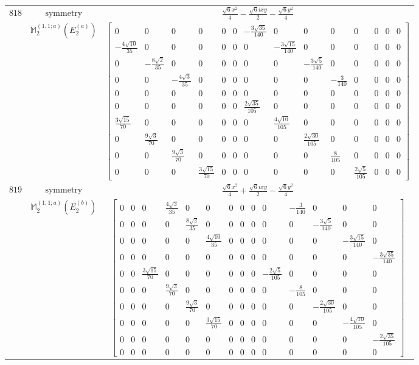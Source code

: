 \documentclass[fleqn,8pt,landscape]{jsarticle}
\begin{document}
\begin{longtable}{ccc}
$ 818 $ & $ \text{symmetry} $ & $ \frac{\sqrt{6} x^{2}}{4} - \frac{\sqrt{6} i x y}{2} - \frac{\sqrt{6} y^{2}}{4} $ \\
$  $ & $ \mathbb{M}_{2}^{(1,1;a)}(E_{2}^{(a)}) $ & $ \begin{bmatrix} 0 & 0 & 0 & 0 & 0 & 0 & - \frac{3 \sqrt{35}}{140} & 0 & 0 & 0 & 0 & 0 & 0 & 0 \\ - \frac{4 \sqrt{10}}{35} & 0 & 0 & 0 & 0 & 0 & 0 & - \frac{3 \sqrt{15}}{140} & 0 & 0 & 0 & 0 & 0 & 0 \\ 0 & - \frac{8 \sqrt{2}}{35} & 0 & 0 & 0 & 0 & 0 & 0 & - \frac{3 \sqrt{5}}{140} & 0 & 0 & 0 & 0 & 0 \\ 0 & 0 & - \frac{4 \sqrt{3}}{35} & 0 & 0 & 0 & 0 & 0 & 0 & - \frac{3}{140} & 0 & 0 & 0 & 0 \\ 0 & 0 & 0 & 0 & 0 & 0 & 0 & 0 & 0 & 0 & 0 & 0 & 0 & 0 \\ 0 & 0 & 0 & 0 & 0 & 0 & \frac{2 \sqrt{35}}{105} & 0 & 0 & 0 & 0 & 0 & 0 & 0 \\ \frac{3 \sqrt{15}}{70} & 0 & 0 & 0 & 0 & 0 & 0 & \frac{4 \sqrt{10}}{105} & 0 & 0 & 0 & 0 & 0 & 0 \\ 0 & \frac{9 \sqrt{3}}{70} & 0 & 0 & 0 & 0 & 0 & 0 & \frac{2 \sqrt{30}}{105} & 0 & 0 & 0 & 0 & 0 \\ 0 & 0 & \frac{9 \sqrt{3}}{70} & 0 & 0 & 0 & 0 & 0 & 0 & \frac{8}{105} & 0 & 0 & 0 & 0 \\ 0 & 0 & 0 & \frac{3 \sqrt{15}}{70} & 0 & 0 & 0 & 0 & 0 & 0 & \frac{2 \sqrt{5}}{105} & 0 & 0 & 0 \end{bmatrix} $ \\ \hline
$ 819 $ & $ \text{symmetry} $ & $ \frac{\sqrt{6} x^{2}}{4} + \frac{\sqrt{6} i x y}{2} - \frac{\sqrt{6} y^{2}}{4} $ \\
$  $ & $ \mathbb{M}_{2}^{(1,1;a)}(E_{2}^{(b)}) $ & $ \begin{bmatrix} 0 & 0 & 0 & \frac{4 \sqrt{3}}{35} & 0 & 0 & 0 & 0 & 0 & 0 & - \frac{3}{140} & 0 & 0 & 0 \\ 0 & 0 & 0 & 0 & \frac{8 \sqrt{2}}{35} & 0 & 0 & 0 & 0 & 0 & 0 & - \frac{3 \sqrt{5}}{140} & 0 & 0 \\ 0 & 0 & 0 & 0 & 0 & \frac{4 \sqrt{10}}{35} & 0 & 0 & 0 & 0 & 0 & 0 & - \frac{3 \sqrt{15}}{140} & 0 \\ 0 & 0 & 0 & 0 & 0 & 0 & 0 & 0 & 0 & 0 & 0 & 0 & 0 & - \frac{3 \sqrt{35}}{140} \\ 0 & 0 & \frac{3 \sqrt{15}}{70} & 0 & 0 & 0 & 0 & 0 & 0 & - \frac{2 \sqrt{5}}{105} & 0 & 0 & 0 & 0 \\ 0 & 0 & 0 & \frac{9 \sqrt{3}}{70} & 0 & 0 & 0 & 0 & 0 & 0 & - \frac{8}{105} & 0 & 0 & 0 \\ 0 & 0 & 0 & 0 & \frac{9 \sqrt{3}}{70} & 0 & 0 & 0 & 0 & 0 & 0 & - \frac{2 \sqrt{30}}{105} & 0 & 0 \\ 0 & 0 & 0 & 0 & 0 & \frac{3 \sqrt{15}}{70} & 0 & 0 & 0 & 0 & 0 & 0 & - \frac{4 \sqrt{10}}{105} & 0 \\ 0 & 0 & 0 & 0 & 0 & 0 & 0 & 0 & 0 & 0 & 0 & 0 & 0 & - \frac{2 \sqrt{35}}{105} \\ 0 & 0 & 0 & 0 & 0 & 0 & 0 & 0 & 0 & 0 & 0 & 0 & 0 & 0 \end{bmatrix} $ \\ \hline

\end{longtable}
\end{document}
